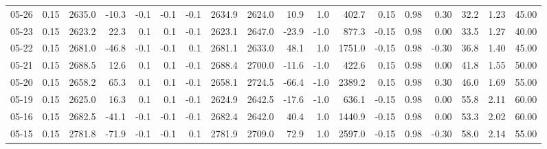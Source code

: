 \begin{threeparttable}
{\begin{tabular}{lrrrrrrrrrrrrrrrrr}
  05-26 &     0.15 & 2635.0 &             -10.3 &              -0.1 &               -0.1 &               -0.1 & 2634.9 & 2624.0 &       10.9 &                      1.0 &               402.7 &       0.15 &      0.98 &           0.30 &             32.2 &            1.23 &                  45.00 \\
  05-23 &     0.15 & 2623.2 &              22.3 &               0.1 &                0.1 &               -0.1 & 2623.1 & 2647.0 &      -23.9 &                     -1.0 &               877.3 &      -0.15 &      0.98 &           0.00 &             33.5 &            1.27 &                  40.00 \\
  05-22 &     0.15 & 2681.0 &             -46.8 &              -0.1 &               -0.1 &                0.1 & 2681.1 & 2633.0 &       48.1 &                      1.0 &              1751.0 &      -0.15 &      0.98 &          -0.30 &             36.8 &            1.40 &                  45.00 \\
  05-21 &     0.15 & 2688.5 &              12.6 &               0.1 &                0.1 &               -0.1 & 2688.4 & 2700.0 &      -11.6 &                     -1.0 &               422.6 &       0.15 &      0.98 &           0.00 &             41.8 &            1.55 &                  50.00 \\
  05-20 &     0.15 & 2658.2 &              65.3 &               0.1 &                0.1 &               -0.1 & 2658.1 & 2724.5 &      -66.4 &                     -1.0 &              2389.2 &       0.15 &      0.98 &           0.30 &             46.0 &            1.69 &                  55.00 \\
  05-19 &     0.15 & 2625.0 &              16.3 &               0.1 &                0.1 &               -0.1 & 2624.9 & 2642.5 &      -17.6 &                     -1.0 &               636.1 &      -0.15 &      0.98 &           0.00 &             55.8 &            2.11 &                  60.00 \\
  05-16 &     0.15 & 2682.5 &             -41.1 &              -0.1 &               -0.1 &               -0.1 & 2682.4 & 2642.0 &       40.4 &                      1.0 &              1440.9 &      -0.15 &      0.98 &           0.00 &             53.3 &            2.02 &                  60.00 \\
  05-15 &     0.15 & 2781.8 &             -71.9 &              -0.1 &               -0.1 &                0.1 & 2781.9 & 2709.0 &       72.9 &                      1.0 &              2597.0 &      -0.15 &      0.98 &          -0.30 &             58.0 &            2.14 &                  55.00 \\

\end{tabular}}
\end{threeparttable}
